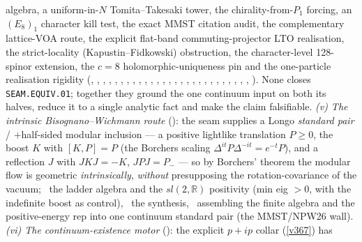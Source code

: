 \documentclass[11pt,a4paper]{article}
\begin{document}
\begin{keybox}
{algebra, a uniform-in-$N$ Tomita--Takesaki tower, the chirality-from-$P_1$ forcing, an $(E_8)_1$ character kill
test, the exact MMST citation audit, the complementary lattice-VOA route, the explicit flat-band
commuting-projector LTO realisation, the strict-locality (Kapustin--Fidkowski) obstruction, the character-level
128-spinor extension, the $c{=}8$ holomorphic-uniqueness pin and the one-particle realisation rigidity
(, , ,
, ,
, ,
, ,
, ,
, ,
, ,
, ,
, ,
, ,
, ,
, ,
, ,
).} None closes
\texttt{SEAM.EQUIV.01}; together they ground the one continuum input on both its halves, reduce it to a single
analytic fact and make the claim falsifiable.
\emph{(v) The intrinsic Bisognano--Wichmann route} (): the seam supplies a
Longo \emph{standard pair} / $+$half-sided modular inclusion --- a positive lightlike translation $P\ge0$, the
boost $K$ with $[K,P]{=}P$ (the Borchers scaling $\Delta^{it}P\Delta^{-it}{=}e^{-t}P$), and a reflection
$J$ with $JKJ{=}{-}K$, $JPJ{=}P_-$ --- so by Borchers' theorem the modular flow is geometric \emph{intrinsically},
\emph{without} presupposing the rotation-covariance of the vacuum; \mE\ the ladder algebra and the $sl(2,\mathbb{R})$
positivity (min eig $>0$, with the indefinite boost as control), \mC\ the synthesis, \mO\ assembling the finite
algebra and the positive-energy rep into one continuum standard pair (the MMST/NPW26 wall). \emph{(vi) The
continuum-existence motor} (): the explicit $p{+}ip$ collar (\vref{v367}) has

\end{keybox}
\end{document}
